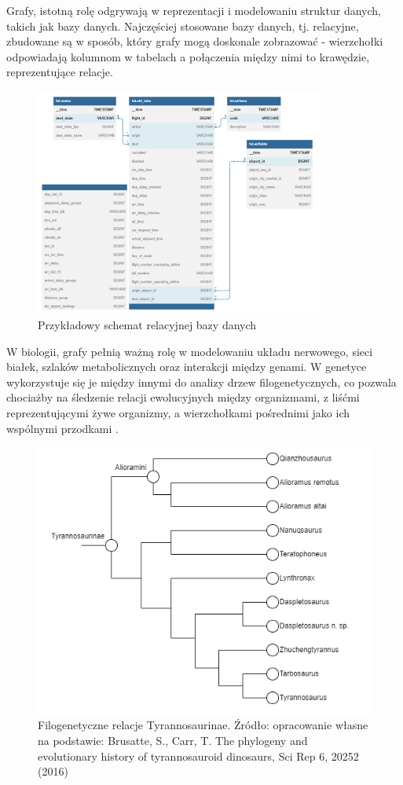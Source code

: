 Grafy, istotną rolę odgrywają w reprezentacji i modelowaniu struktur danych, takich jak bazy danych.
Najczęściej stosowane bazy danych, tj. relacyjne, zbudowane są w sposób, który grafy mogą doskonale zobrazować -
wierzchołki odpowiadają kolumnom w tabelach a połączenia między nimi to krawędzie, reprezentujące relacje.

\begin{figure}[ht]
	\centering
	\includegraphics[height=7.5cm]{partials/introduction/images/database.png}
	\caption{Przykładowy schemat relacyjnej bazy danych}
    \label{Fig:intro-2}
\end{figure}

W biologii, grafy pełnią ważną rolę w modelowaniu układu nerwowego, sieci białek,
szlaków metabolicznych oraz interakcji między genami.
W genetyce wykorzystuje się je między innymi do analizy drzew filogenetycznych,
co pozwala chociażby na śledzenie relacji ewolucyjnych między organizmami,
z liśćmi reprezentującymi żywe organizmy, a wierzchołkami pośrednimi jako ich wspólnymi przodkami \cite{Erciyes2023}.

\begin{figure}[ht]
	\centering
	\includegraphics[width=12cm]{partials/introduction/images/dino.png}
	\caption{Filogenetyczne relacje Tyrannosaurinae.
		Źródło: opracowanie własne na podstawie: Brusatte, S., Carr, T.
		The phylogeny and evolutionary history of tyrannosauroid dinosaurs, Sci Rep 6, 20252 (2016)}
    \label{Fig:intro-3}
\end{figure}

